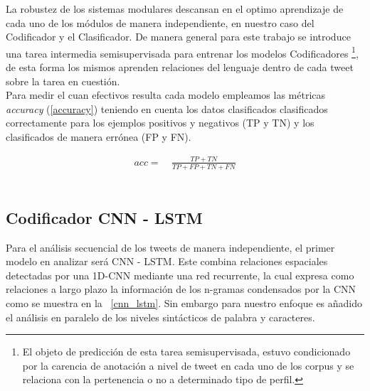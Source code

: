 	 La robustez de los sistemas modulares descansan en el optimo aprendizaje de cada uno de los módulos de manera independiente, en nuestro caso del Codificador y el Clasificador. De manera general para este trabajo se introduce una tarea intermedia semisupervisada para entrenar los modelos Codificadores \footnote{El objeto de predicción de esta tarea semisupervisada, estuvo condicionado por la carencia de anotación a nivel de tweet en cada uno de los corpus y se relaciona con la pertenencia o no a determinado tipo de perfil.}, de esta forma los mismos aprenden relaciones del lenguaje dentro de cada tweet sobre la tarea en cuestión.\\
	 Para medir el cuan efectivos resulta cada modelo empleamos las métricas \textit{accuracy} (\ref{accuracy}) teniendo en cuenta los datos clasificados clasificados correctamente para los ejemplos positivos y negativos (TP y TN) y los clasificados de manera errónea (FP y FN).
	 
	 \begin{align}
	 	acc=~& \frac{TP + TN}{TP + FP + TN + FN}\label{accuracy}
	 \end{align}\\%
 
 	\subsection{Codificador CNN - LSTM}
 	
 	Para el análisis secuencial de los tweets de manera independiente, el primer modelo en analizar será CNN - LSTM. Este combina relaciones espaciales detectadas por una 1D-CNN mediante una red recurrente, la cual expresa como relaciones a largo plazo la información de los n-gramas condensados por la CNN como se muestra en la \figurename~\ref{cnn_lstm}.   Sin embargo para nuestro enfoque es añadido el análisis en paralelo de los niveles sintácticos de palabra y caracteres.  	\\
 	
